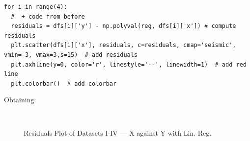 \documentclass[11pt,a4paper]{article}
\begin{document}
\begin{lstlisting}
for i in range(4):
  #  + code from before
  residuals = dfs[i]['y'] - np.polyval(reg, dfs[i]['x']) # compute residuals
  plt.scatter(dfs[i]['x'], residuals, c=residuals, cmap='seismic', vmin=-3, vmax=3,s=15)  # add residuals
  plt.axhline(y=0, color='r', linestyle='--', linewidth=1)  # add red line
  plt.colorbar()  # add colorbar
\end{lstlisting}
Obtaining:
\begin{figure}[ht]
\centering
{}\qquad
{}\\
\qquad%
%
\caption{Residuals Plot of Datasets I-IV — X against Y with Lin. Reg.}
\label{fig:rplots}
\end{figure}
\end{document}
